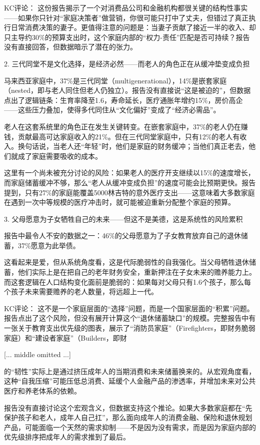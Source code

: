 \documentclass[11pt]{ctexart}
\begin{document}
KC评论： 这份报告揭示了一个对消费品公司和金融机构都很关键的结构性事实——如果你只针对“家庭决策者”做营销，你很可能只打中了丈夫，但错过了真正执行日常消费决策的妻子。更值得注意的问题是：当妻子贡献了接近一半的收入、却只主导约30\%的预算支出时，这个家庭内部的“权力-责任”匹配是否可持续？报告没有直接回答，但数据暗示了潜在的张力。

2. 三代同堂不是文化选择，是经济必然——而老人的角色正在从缓冲垫变成负担

马来西亚家庭中，37\%是三代同堂（multigenerational），14\%是嵌套家庭（nested，即与老人同住但老人仍独立）。报告没有直接说“这是被迫的”，但数据点出了逻辑链条：生育率降至1.6，寿命延长，医疗通胀年增约15\%，房价高企——这些压力叠加，使得多代同住从“文化偏好”变成了“经济必需品”。

老人在这套系统里的角色正在发生关键转变。在嵌套家庭中，37\%的老人仍在赚钱，贡献最高可达家庭收入的21\%。但在三代同堂家庭中，只有12\%的老人有收入。换句话说，当老人还“年轻”时，他们是家庭的财务缓冲；当他们真正老去，他们就成了家庭需要吸收的成本。

这里有一个尚未被充分讨论的风险：如果老人的医疗开支继续以15\%的速度增长，而家庭储蓄缓冲不够，那么“老人从缓冲变成负担”的速度可能会比预期更快。报告提到，只有27\%的家庭能覆盖5000林吉特的意外医疗支出——这意味着大多数家庭在遇到一次中等规模的医疗冲击时，就可能被迫重新分配整个家庭的预算。

3. 父母愿意为子女牺牲自己的未来——但这不是美德，这是系统性的风险累积

报告中最令人不安的数据之一：46\%的父母愿意为了子女教育放弃自己的退休储蓄，37\%愿意为此举债。

这看起来是爱，但从系统角度看，这是代际脆弱性的自我强化。当父母牺牲退休储蓄，他们实际上是在把自己的老年财务安全，重新押注在子女未来的赡养能力上。而这套逻辑在人口结构变化面前是脆弱的：如果每对父母只有1.6个孩子，那么每个孩子未来需要赡养的老人数量，将远超上一代。

KC评论： 这不是一个家庭层面的“选择”问题，而是一个国家层面的“积累”问题。报告点出了这个风险，但没有展开计算这个“退休储蓄缺口”的规模。完整报告中有一张关于教育支出优先级的图表，展示了“消防员家庭”（Firefighters，即财务脆弱家庭）和“建设者家庭”（Builders，即财

[... middle omitted ...]

的“韧性”实际上是通过挤压成年人的当期消费和未来储蓄换来的。从宏观角度看，这种“自我压缩”可能压低总消费、延缓个人金融产品的渗透率，并增加未来对公共医疗和养老体系的依赖。

报告没有直接讨论这个宏观含义，但数据支持这个推论。如果大多数家庭都在“先保护孩子和老人，成年人自己扛”，那么面向成年人的消费金融、保险和退休规划产品，可能面临一个天然的需求抑制——不是因为没有需求，而是因为家庭内部的优先级排序把成年人的需求推到了最后。
\end{document}
